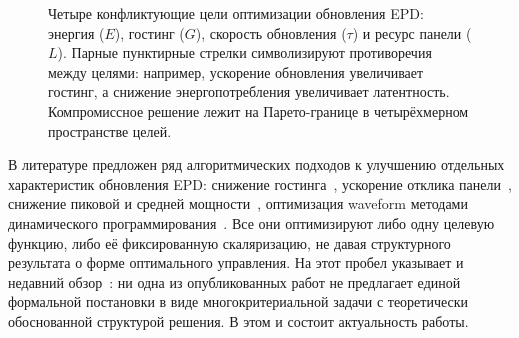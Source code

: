 \begin{figure}[H]
    \centering
    \caption{Четыре конфликтующие цели оптимизации обновления EPD: энергия
        ($E$), гостинг ($G$), скорость обновления ($\tau$) и ресурс панели
        ($L$). Парные пунктирные стрелки символизируют противоречия между
        целями: например, ускорение обновления увеличивает гостинг, а
        снижение энергопотребления увеличивает латентность. Компромиссное
        решение лежит на Парето-границе в четырёхмерном пространстве целей.}
    \label{fig:intro-opt-axes}
\end{figure}

В литературе предложен ряд алгоритмических подходов к улучшению отдельных
характеристик обновления EPD: снижение гостинга~\cite{wang2022_red_ghost},
ускорение отклика панели~\cite{he2020_particle_activation}, снижение пиковой и
средней мощности~\cite{lin2024_low_power, lai2026_e3dw_energy}, оптимизация
waveform методами динамического программирования~\cite{kang2025_dp_waveform}.
Все они оптимизируют либо одну целевую функцию, либо её фиксированную
скаляризацию, не давая структурного результата о форме оптимального
управления. На этот пробел указывает и недавний обзор~\cite{zhong2026_review}: ни одна
из опубликованных работ не предлагает единой
формальной постановки в виде многокритериальной задачи с теоретически
обоснованной структурой решения. В этом и состоит актуальность работы.


